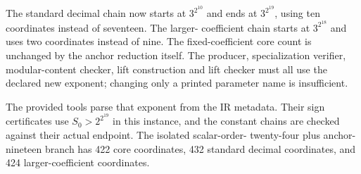 The standard decimal chain now starts at $3^{2^{10}}$ and ends at
$3^{2^{19}}$, using ten coordinates instead of seventeen. The larger-
coefficient chain starts at $3^{2^{18}}$ and uses two coordinates instead
of nine. The fixed-coefficient core count is unchanged by the anchor
reduction itself. The producer, specialization verifier, modular-content
checker, lift construction and lift checker must all use the declared
new exponent; changing only a printed parameter name is insufficient.

The provided tools parse that exponent from the IR metadata. Their sign
certificates use $S_0>2^{2^{19}}$ in this instance, and the constant chains
are checked against their actual endpoint. The isolated scalar-order-
twenty-four plus anchor-nineteen branch has 422 core coordinates,
432 standard decimal coordinates, and 424 larger-coefficient coordinates.
